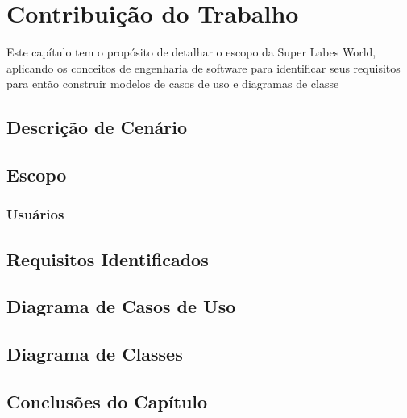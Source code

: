 \chapter{Contribuição do Trabalho}
\label{sec-contribuicao}



Este capítulo tem o propósito de detalhar o escopo da Super Labes World, aplicando os conceitos de engenharia de software para identificar seus requisitos para então construir modelos de casos de uso e diagramas de classe
\section{Descrição de Cenário}

\section{Escopo}

\subsection{Usuários}

\section{Requisitos Identificados}

\section{Diagrama de Casos de Uso}

\section{Diagrama de Classes}


\section{Conclusões do Capítulo}
